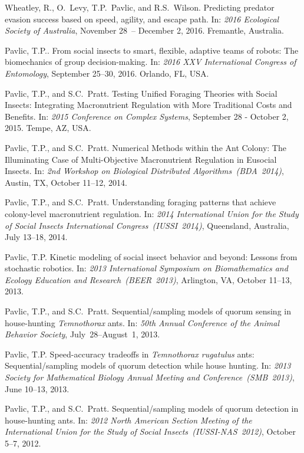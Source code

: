 \documentclass[10pt]{article}
\begin{document}
\begin{bibenum}
    \item Wheatley, R., O.~Levy, T.P.~Pavlic, and R.S.~Wilson.
        Predicting predator evasion success based on speed, agility, and
        escape path. In: \emph{2016 Ecological Society of Australia},
        November 28~-- December 2, 2016. Fremantle, Australia.

    \item Pavlic, T.P.. From social insects to smart, flexible, adaptive
        teams of robots: The biomechanics of group decision-making. In:
        \emph{2016 XXV International Congress of Entomology}, September
        25--30, 2016. Orlando, FL, USA.

    \item Pavlic, T.P., and S.C.~Pratt. Testing Unified Foraging
        Theories with Social Insects: Integrating Macronutrient
        Regulation with More Traditional Costs and Benefits. In:
        \emph{2015 Conference on Complex Systems}, September 28 -
        October 2, 2015. Tempe, AZ, USA.

    \item Pavlic, T.P., and S.C.~Pratt.
        Numerical Methods within the Ant Colony: The Illuminating Case
        of Multi-Objective Macronutrient Regulation in Eusocial Insects.
        In: \emph{2nd Workshop on Biological Distributed
        Algorithms~(BDA~2014)}, Austin, TX, October 11--12, 2014.

    \item Pavlic, T.P., and S.C.~Pratt. Understanding foraging patterns
        that achieve colony-level macronutrient regulation. In:
        \emph{2014 International Union for the Study of Social Insects
        International Congress~(IUSSI~2014)}, Queensland, Australia,
        July 13--18, 2014.

    \item Pavlic, T.P.
        Kinetic modeling of social insect behavior and beyond: Lessons
        from stochastic robotics. In: \emph{2013 International Symposium
        on Biomathematics and Ecology Education and
        Research~(BEER~2013)}, Arlington, VA, October 11--13, 2013.

    \item Pavlic, T.P., and S.C.~Pratt.
        Sequential\-/sampling models of quorum sensing in house-hunting
        \emph{Temnothorax} ants. In: \emph{50th Annual Conference of the
        Animal Behavior Society}, July~28--August~1, 2013.

    \item Pavlic, T.P. Speed\--accuracy tradeoffs in \emph{Temnothorax
        rugatulus} ants: Sequential\-/sampling models of quorum
        detection while house hunting. In: \emph{2013 Society for
        Mathematical Biology Annual Meeting and Conference~(SMB~2013)},
        June 10--13, 2013.

    \item Pavlic, T.P., and S.C.~Pratt. Sequential\-/sampling models of
        quorum detection in house-hunting ants. In: \emph{2012 North
        American Section Meeting of the International Union for the
        Study of Social Insects~(IUSSI-NAS~2012)}, October 5--7, 2012.

\end{bibenum}
\end{document}
